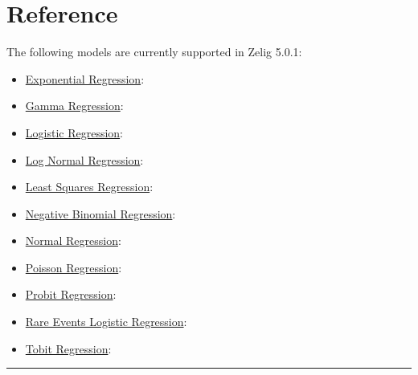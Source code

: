 \documentclass[letterpaper,10pt,english]{sphinxmanual}
\begin{document}
\section{Reference}
\label{vignette:reference}
The following models are currently supported in Zelig 5.0.1:
\begin{itemize}
\item {} 
\href{http://zeligproject.org/vignette.html\#zelig-exp}{Exponential Regression}: 

\item {} 
\href{http://zeligproject.org/vignette.html\#zelig-gamma}{Gamma Regression}: 

\item {} 
\href{http://zeligproject.org/vignette.html\#zelig-logit}{Logistic Regression}: 

\item {} 
\href{http://zeligproject.org/vignette.html\#zelig-lognorm}{Log Normal Regression}: 

\item {} 
\href{http://zeligproject.org/vignette.html\#zelig-ls}{Least Squares Regression}: 

\item {} 
\href{http://zeligproject.org/vignette.html\#zelig-exp}{Negative Binomial Regression}: 

\item {} 
\href{http://zeligproject.org/vignette.html\#zelig-normal}{Normal Regression}: 

\item {} 
\href{http://zeligproject.org/vignette.html\#zelig-poisson}{Poisson Regression}: 

\item {} 
\href{http://zeligproject.org/vignette.html\#zelig-probit}{Probit Regression}: 

\item {} 
\href{http://zeligproject.org/vignette.html\#zelig-relogit}{Rare Events Logistic Regression}: 

\item {} 
\href{http://zeligproject.org/vignette.html\#zelig-tobit}{Tobit Regression}: 

\end{itemize}


\bigskip\hrule{}\bigskip
\end{document}
